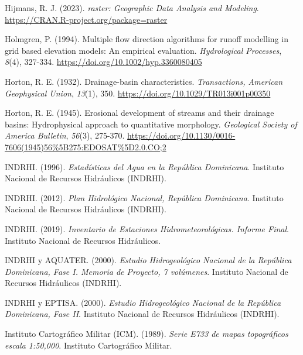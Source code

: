 \documentclass[spanish]{article}
\newlength{\cslhangindent}
\newlength{\cslentryspacingunit} %
\newenvironment{CSLReferences}[2] %
 {%
  \setlength{\parindent}{0pt}
  \ifodd #1
  \let\oldpar\par
  \def\par{\hangindent=\cslhangindent\oldpar}
  \fi
  \setlength{\parskip}{#2\cslentryspacingunit}
 }%
 {}
\begin{document}
\begin{CSLReferences}{1}{0}
\leavevmode{}%
Hijmans, R. J. (2023). \emph{raster: Geographic Data Analysis and
Modeling}. \url{https://CRAN.R-project.org/package=raster}

\leavevmode{}%
Holmgren, P. (1994). Multiple flow direction algorithms for runoff
modelling in grid based elevation models: An empirical evaluation.
\emph{Hydrological Processes}, \emph{8}(4), 327-334.
\url{https://doi.org/10.1002/hyp.3360080405}

\leavevmode{}%
Horton, R. E. (1932). Drainage-basin characteristics.
\emph{Transactions, American Geophysical Union}, \emph{13}(1), 350.
\url{https://doi.org/10.1029/TR013i001p00350}

\leavevmode{}%
Horton, R. E. (1945). {Erosional development of streams and their
drainage basins: Hydrophysical approach to quantitative morphology}.
\emph{Geological Society of America Bulletin}, \emph{56}(3), 275-370.
\url{https://doi.org/10.1130/0016-7606(1945)56\%5B275:EDOSAT\%5D2.0.CO;2}

\leavevmode{}%
INDRHI. (1996). \emph{{Estadísticas del Agua en la República
Dominicana}}. {Instituto Nacional de Recursos Hidráulicos (INDRHI)}.

\leavevmode{}%
INDRHI. (2012). \emph{{Plan Hidrológico Nacional, República
Dominicana}}. {Instituto Nacional de Recursos Hidráulicos (INDRHI)}.

\leavevmode{}%
INDRHI. (2019). \emph{{Inventario de Estaciones Hidrometeorológicas.
Informe Final}}. {Instituto Nacional de Recursos Hidráulicos}.

\leavevmode{}%
INDRHI y AQUATER. (2000). \emph{{Estudio Hidrogeológico Nacional de la
República Dominicana, Fase I. Memoria de Proyecto, 7 volúmenes}}.
{Instituto Nacional de Recursos Hidráulicos (INDRHI)}.

\leavevmode{}%
INDRHI y EPTISA. (2000). \emph{{Estudio Hidrogeológico Nacional de la
República Dominicana, Fase II}}. {Instituto Nacional de Recursos
Hidráulicos (INDRHI)}.

\leavevmode{}%
Instituto Cartográfico Militar (ICM). (1989). \emph{{Serie E733 de mapas
topográficos escala 1:50,000}}. {Instituto Cartográfico Militar}.


\end{CSLReferences}
\end{document}
